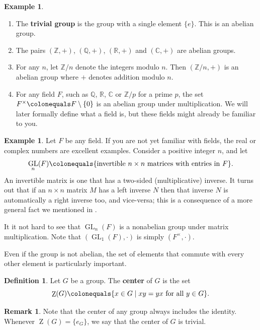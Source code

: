 \documentclass[12pt]{report}
\numberwithin{equation}{section}
\numberwithin{theorem}{chapter}
\theoremstyle{definition}
\newtheorem{definition}[theorem]{Definition}
\newtheorem{example}[theorem]{Example}
\newtheorem*{basic properties}{Basic Properties}
\newtheorem*{Important Remark}{Important Remark}
\newtheorem{remark}[theorem]{Remark}
\newcommand{\df}[1]{{\bf #1}\index{#1}}
\DeclareMathOperator{\GL}{GL}
\newcommand{\R}{\mathbb{R}}
\newcommand{\Z}{\mathbb{Z}}
\newcommand{\Q}{\mathbb{Q}}
\newcommand{\C}{\mathbb{C}}
\DeclareMathOperator{\Zc}{Z}
\begin{document}
\begin{example}$\,$
\begin{enumerate}
\item The \df{trivial group} is the group with a single element $\{e\}$. This is an abelian group. 
\item  The pairs $(\Z, +)$, $(\Q, +)$, $(\R, +)$ and $(\C,+)$ are abelian groups. 
\item For any $n$, let $\Z/n$ denote the integers modulo $n$. Then $(\Z/n, +)$ is an abelian group where $+$ denotes addition modulo $n$.
\item For any field $F$, such as $\Q$, $\R$, $\C$ or $\Z/p$ for a prime $p$, the set $F^\times \colonequals F \setminus \{0\}$ is an abelian group under multiplication. We will later formally define what a field is, but these fields might already be familiar to you.
\end{enumerate}
\end{example}

\begin{example} 
Let $F$ be any field. If you are not yet familiar with fields, the real or complex numbers are excellent examples.  Consider a positive integer $n$, and let 
$$\GL_n(F) \colonequals \{ \text{invertible }  n \times n \text{ matrices with entries in } F \}.$$
An invertible matrix is one that has a two-sided (multiplicative) inverse. It turns out that if an $n \times n$ matrix $M$ has a left inverse $N$ then that inverse $N$ is automatically a right inverse too, and vice-versa; this is a consequence of a more general fact we mentioned in .

It it not hard to see that $\GL_n(F)$ is a nonabelian group under matrix multiplication. Note that $(\GL_1(F), \cdot)$ is simply $(F^\times, \cdot)$. 	
\end{example}


Even if the group is not abelian, the set of elements that commute with every other element is particularly important.


\begin{definition}
	Let $G$ be a group. The {\bf center} of $G$ is the set
	$$\Zc(G) \colonequals \lbrace x \in G \mid xy = yx \textrm{ for all } y \in G \rbrace.$$
\end{definition}

\begin{remark}
	Note that the center of any group always includes the identity. Whenever $\Zc(G) = \{ e_G \}$, we say that the center of $G$ is trivial.
\end{remark}
\end{document}
